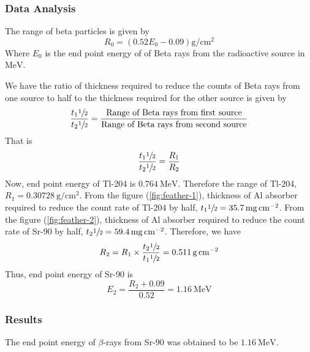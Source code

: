 \documentclass[%
 reprint,
nofootinbib,
 amsmath,amssymb,
 aps,
floatfix,
]{revtex4-2}
\begin{document}
        \subsubsection{Data Analysis}
        The range of beta particles is given by
        \begin{equation}
            R_0 = (0.52 E_0 - 0.09) \si{\gram \per \centi \metre \squared}
        \end{equation}
        Where $E_0$ is the end point energy of of Beta rays from the radioactive source in $\si{\mega \electronvolt}$.
        \par
        We have the ratio of thickness required to reduce the counts of Beta rays from one source to half to the thickness required for the other source is given by
        \begin{equation}
            \dfrac{t_1 \sfrac{1}{2}}{t_2 \sfrac{1}{2}} = \dfrac{\text{Range of Beta rays from first source}}{\text{Range of Beta rays from second source}}
        \end{equation}
        That is
        \begin{equation}
            \dfrac{t_1 \sfrac{1}{2}}{t_2 \sfrac{1}{2}} = \dfrac{R_1}{R_2}
        \end{equation}
        Now, end point energy of Tl-204 is $\SI{0.764}{\mega \electronvolt}$. Therefore the range of Tl-204, $R_1 = \SI{0.30728}{\gram \per \centi \metre \squared}$. From the figure (\ref{fig:feather-1}), thickness of Al absorber required to reduce the count rate of Tl-204 by half, $t_1 \sfrac{1}{2} = \SI{35.7}{\milli \gram \per \centi \metre \squared}$. From the figure (\ref{fig:feather-2}), thickness of Al absorber required to reduce the count rate of Sr-90 by half, $t_2 \sfrac{1}{2} = \SI{59.4}{\milli \gram \per \centi \metre \squared}$. Therefore, we have
        \begin{equation}
            R_2 = R_1 \times \dfrac{t_2 \sfrac{1}{2}}{t_1 \sfrac{1}{2}} = \SI{0.511}{\gram \per \centi \metre \squared}
        \end{equation}
        Thus, end point energy of Sr-90 is
        \begin{equation}
            E_2 = \dfrac{R_2 +0.09}{0.52} = \SI{1.16}{\mega \electronvolt}
        \end{equation}
        \subsubsection{Results}
        The end point energy of $\beta$-rays from Sr-90 was obtained to be $\SI{1.16}{\mega \electronvolt}$.
\end{document}
